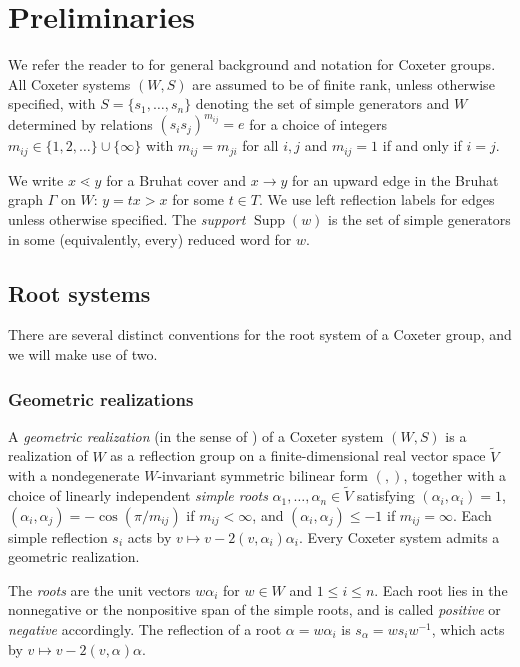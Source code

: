 \documentclass[11pt]{amsart}
\theoremstyle{definition}
\theoremstyle{remark}
\numberwithin{equation}{section}
\DeclareMathOperator{\supp}{Supp}
\begin{document}
\section{Preliminaries}\label{sec:preliminaries}

We refer the reader to \cite{BB} for general background and notation for Coxeter groups. All Coxeter systems $(W,S)$ are assumed to be of finite rank, unless otherwise specified, with $S=\{s_1,\ldots,s_n\}$ denoting the set of simple generators and $W$ determined by relations $(s_is_j)^{m_{ij}}=e$ for a choice of integers $m_{ij} \in \{1,2,\ldots\} \cup \{\infty\}$ with $m_{ij}=m_{ji}$ for all $i,j$ and $m_{ij}=1$ if and only if $i=j$.

We write $x\lessdot y$ for a Bruhat cover and
$x\to y$ for an upward edge in the Bruhat graph $\Gamma$ on $W$: $y=tx>x$ for some $t\in T$. We use left reflection labels for edges unless otherwise specified. The \emph{support} $\supp(w)$ is the set of simple generators
in some (equivalently, every) reduced word for $w$. 

\subsection{Root systems}\label{sec:root-systems}
There are several distinct conventions for the root system of a Coxeter group, and we will make use of two.

\subsubsection{Geometric realizations}
A \emph{geometric realization} (in the sense of \cite[\S2]{DyerDeodhar}) of a Coxeter system $(W,S)$ is a realization of $W$ as a reflection group on a finite-dimensional real vector space $\tilde V$ with a nondegenerate $W$-invariant symmetric bilinear form $(,)$, together with a choice of linearly independent \emph{simple roots} $\alpha_1,\ldots,\alpha_n\in\tilde V$ satisfying $(\alpha_i,\alpha_i)=1$, $(\alpha_i,\alpha_j)=-\cos(\pi/m_{ij})$ if $m_{ij}<\infty$, and $(\alpha_i,\alpha_j)\le-1$ if $m_{ij}=\infty$. Each simple reflection $s_i$ acts by $v\mapsto v-2(v,\alpha_i)\alpha_i$. Every Coxeter system admits a geometric realization.

The \emph{roots} are the unit vectors $w\alpha_i$ for $w\in W$ and $1\le i\le n$. Each root lies in the nonnegative or the nonpositive span of the simple roots, and is called \emph{positive} or \emph{negative} accordingly. The reflection of a root $\alpha=w\alpha_i$ is $s_\alpha=ws_iw^{-1}$, which acts by $v\mapsto v-2(v,\alpha)\alpha$. 
\end{document}
